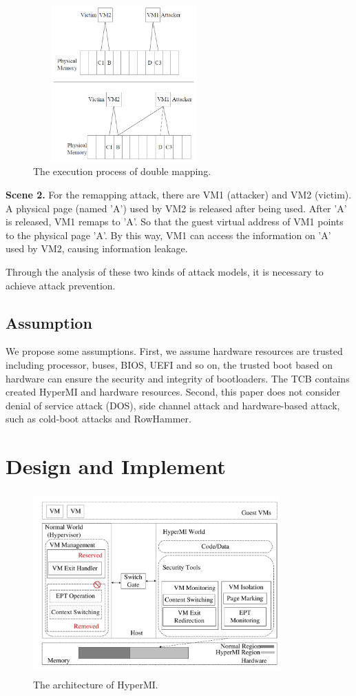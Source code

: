 \documentclass[conference]{IEEEtran}
\begin{document}
\begin{figure}
\centerline{\includegraphics[width=7cm, height=6cm]{VMCS0.jpg}}%
\caption{The execution process of double mapping. } \label{fig0}
\end{figure}

\textbf{Scene 2.}
    For the remapping attack, there are VM1 (attacker) and VM2 (victim). A physical page (named 'A') used by VM2 is released after being used. After 'A' is released, VM1 remaps to 'A'. So that the guest virtual address of VM1 points to the physical page 'A'. By this way, VM1 can access the information on 'A' used by VM2, causing information leakage.

Through the analysis of these two kinds of attack models, it is necessary to achieve attack prevention.
\subsection{Assumption}

We propose some assumptions.
First, we assume hardware resources are trusted including processor, buses, BIOS, UEFI and so on, the trusted boot based on hardware can ensure the security and integrity of bootloaders. The TCB contains created HyperMI and hardware resources. Second, this paper does not consider denial of service attack (DOS), side channel attack and hardware-based attack, such as cold-boot attacks and RowHammer.


\section{Design and Implement}\label{sec:design}


\begin{figure}
\centerline{\includegraphics[width=9.5cm, height=7cm]{pdfvmcs1.pdf}}%
\caption{The architecture of HyperMI. } \label{fig1}
\end{figure}
\end{document}
